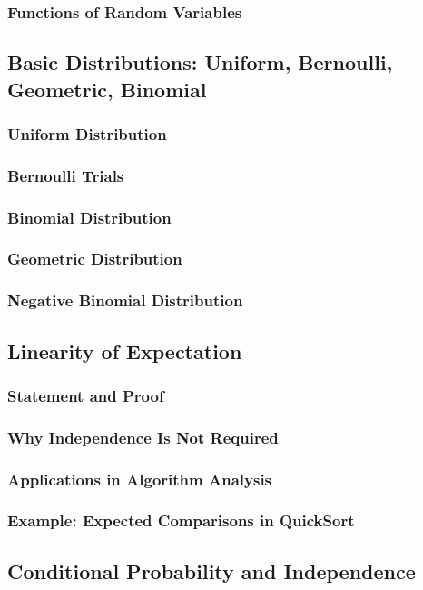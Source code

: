\subsubsection{Functions of Random Variables}

\subsection{Basic Distributions: Uniform, Bernoulli, Geometric, Binomial}
\subsubsection{Uniform Distribution}
\subsubsection{Bernoulli Trials}
\subsubsection{Binomial Distribution}
\subsubsection{Geometric Distribution}
\subsubsection{Negative Binomial Distribution}

\subsection{Linearity of Expectation}
\subsubsection{Statement and Proof}
\subsubsection{Why Independence Is Not Required}
\subsubsection{Applications in Algorithm Analysis}
\subsubsection{Example: Expected Comparisons in QuickSort}

\subsection{Conditional Probability and Independence}
